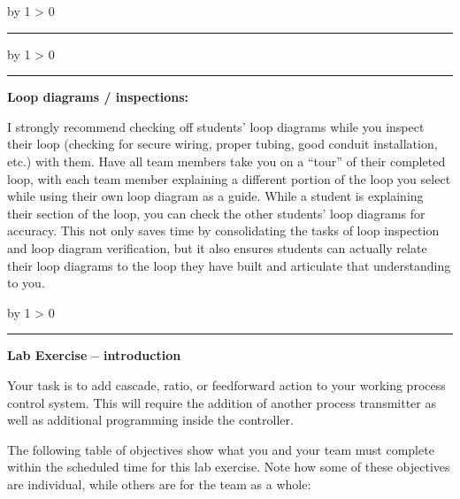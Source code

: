 \documentclass[12pt,a4paper]{article}
\def\oppgave{
            \advance\questnum by 1
            \ifnum \questnum > 0
                 \hrule
                 \vskip 3pt
                 \leftline{Oppgave \the\questnum}
                 \vskip 3pt \fi}
\def\svar{
           \advance\answnum by 1
           \ifnum \answnum > 0
                \hrule
                \vskip 3pt
                \leftline{Svar \the\answnum}
                \vskip 3pt \fi}
\def\notes{
           \advance\explnum by 1
           \ifnum \explnum > 0
                \hrule
                \vskip 3pt
                \leftline{Notes \the\explnum}
                \vskip 3pt \fi}
\begin{document}
\vskip 10pt

\vskip 10pt \filbreak 





\svar{} 


\vskip 10pt \filbreak 





\notes{} 

\noindent
{\bf Loop diagrams / inspections:}

I strongly recommend checking off students' loop diagrams while you inspect their loop (checking for secure wiring, proper tubing, good conduit installation, etc.) with them.  Have all team members take you on a ``tour'' of their completed loop, with each team member explaining a different portion of the loop you select while using their own loop diagram as a guide.  While a student is explaining their section of the loop, you can check the other students' loop diagrams for accuracy.  This not only saves time by consolidating the tasks of loop inspection and loop diagram verification, but it also ensures students can actually relate their loop diagrams to the loop they have built and articulate that understanding to you.


\vfil \eject 



\oppgave{} 

\noindent
{\bf Lab Exercise -- introduction}

\vskip 5pt

Your task is to add cascade, ratio, or feedforward action to your working process control system.  This will require the addition of another process transmitter as well as additional programming inside the controller.

The following table of objectives show what you and your team must complete within the scheduled time for this lab exercise.  Note how some of these objectives are individual, while others are for the team as a whole:


\end{document}
